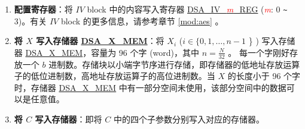 \documentclass[main\_\_CN.tex]{subfiles}
\begin{document}
\begin{enumerate}
\begin{itemize}
        \item 如果读到零值，说明 HMAC 未被调用。

        \item 如果读到非零值 (1 \verb+~+ 15)，则说明 HMAC 被调用过，但是 RSA\_DS 外设没有成功从 HMAC 模块获取到 \begin{math}RSA\_DS\_KEY\end{math}。此种情况可能是因为受到了其他程序的干扰。

    \end{itemize}

    \item {\bfseries 配置寄存器}：将 \begin{math}IV\end{math} block 中的内容写入寄存器 \hyperref[regdesc:DSAIVREG]{DSA\_IV\_\textcolor{red}{\it{m}}\_REG} (\textcolor{red}{\it{m}}: 0 \verb+~+ 3)。有关 \begin{math}IV\end{math} block 的更多信息，请参考章节 \ref{mod:aes} \textit{}。

    \item {\bfseries 将 \begin{math}X\end{math} 写入存储器 \hyperref[DSAXMEM]{DSA\_X\_MEM}}：将 \begin{math}X_{i}\end{math}
        (\begin{math}i \in \{ 0, 1, \dots, n-1 \end{math} \} )
        写入存储器 \hyperref[DSAXMEM]{DSA\_X\_MEM}，容量为 96 个字 (word)，其中 \begin{math} n = \frac{N}{32} \end{math} 。
        每一个字刚好存放一个 \begin{math}b\end{math} 进制数。存储块以小端字节序进行存储，即存储器的低地址存放运算子的低位进制数，高地址存放运算子的高位进制数。当 \begin{math}X\end{math} 的长度小于 96 个字时，存储器 \hyperref[DSAXMEM]{DSA\_X\_MEM} 中有一部分空间未使用，该部分空间中的数据可以是任意值。

    \item {\bfseries 将 \begin{math}C\end{math} 写入存储器}：即将 \begin{math}C\end{math} 中的四个子参数分别写入对应的存储器。
    \begin{itemize}


\end{itemize}
\end{enumerate}
\end{document}
